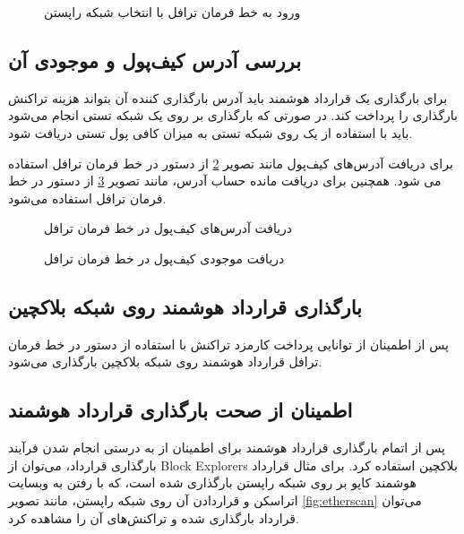 \begin{figure}
\centerline{}
\caption{ورود به خط فرمان ترافل با انتخاب شبکه راپستن}
\label{fig:truffle-console}
\end{figure}


\subsection{بررسی آدرس کیف‌پول و موجودی آن}
برای بارگذاری یک قرارداد هوشمند باید آدرس بارگذاری کننده آن بتواند هزینه تراکنش بارگذاری را پرداخت کند.
در صورتی که بارگذاری بر روی یک شبکه تستی انجام می‌شود باید با استفاده از یک
روی شبکه تستی به میزان کافی پول تستی دریافت شود.

برای دریافت آدرس‌های کیف‌پول مانند تصویر
\ref{fig:get-addresses}
از دستور
در خط فرمان ترافل استفاده می شود.
همچنین برای دریافت مانده حساب آدرس، مانند تصویر
\ref{fig:get-wallet-balance}
از دستور
در خط فرمان ترافل استفاده می‌شود.

\begin{figure}
\centerline{}
\caption{دریافت آدرس‌های کیف‌پول در خط فرمان ترافل}
\label{fig:get-addresses}
\end{figure}

\begin{figure}
\centerline{}
\caption{دریافت موجودی کیف‌پول در خط فرمان ترافل}
\label{fig:get-wallet-balance}
\end{figure}


\subsection{بارگذاری قرارداد هوشمند روی شبکه بلاکچین}
پس از اطمینان از توانایی پرداخت کارمزد تراکنش با استفاده از دستور
در خط فرمان ترافل قرارداد هوشمند روی شبکه بلاکچین بارگذاری می‌شود.


\subsection{اطمینان از صحت بارگذاری قرارداد هوشمند}
پس از اتمام بارگذاری قرارداد هوشمند برای اطمینان از به درستی انجام شدن فرآیند بارگذاری قرارداد،
می‌توان از
\glspl{Block Explorer}
بلاکچین استفاده کرد.
برای مثال قرارداد هوشمند کاپو بر روی شبکه راپستن بارگذاری شده است، که با رفتن به وبسایت اتراسکن
و قراردادن آن روی شبکه راپستن، مانند تصویر
\ref{fig:etherscan}
می‌توان قرارداد بارگذاری شده و تراکنش‌های آن را مشاهده کرد.


